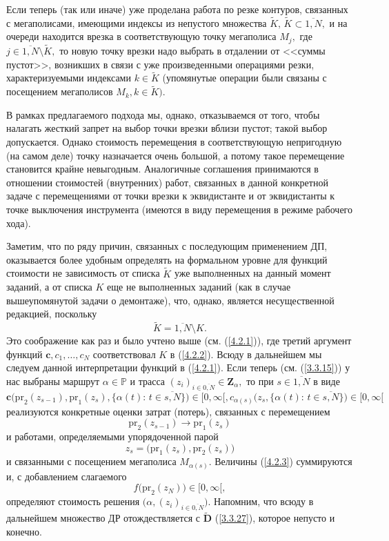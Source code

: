 \documentclass[11pt,twoside,openany]{report}
\newcommand{\bfn}{\begin{equation}}
\newcommand{\efn}{\end{equation}}
\newcommand{\ov}{\overline}
\newcommand{\al}{\alpha}
\newcommand{\su}{\subset}
\newcommand{\sm}{\setminus}
\newcommand{\bbp}{{\mathbb P}}
\begin{document}
{Если теперь (так или иначе) уже проделана работа по резке контуров,
связанных с мегаполисами, имеющими индексы из непустого множества
$\widetilde{K},\, \widetilde{K}\su \ov{1,N},$ и на очереди находится
врезка в соответствующую точку мегаполиса $M_j,$ где $j\in \ov{1,N}\sm
\widetilde{K},$ то новую точку врезки надо выбрать  в отдалении от
<<суммы пустот>>, возникших в связи с уже произведенными операциями
резки, характеризуемыми индексами $k\in \widetilde{K}$ (упомянутые
операции были связаны с посещением мегаполисов $M_k, k\in \widetilde{K}).$

В рамках предлагаемого подхода мы, однако, отказываемся от того, чтобы
налагать жесткий запрет на выбор точки врезки вблизи пустот; такой выбор
допускается. Однако стоимость перемещения в соответствующую непригодную
(на самом деле) точку назначается очень большой, а потому такое перемещение
становится крайне невыгодным.  Аналогичные соглашения принимаются в отношении
стоимостей (внутренних) работ, связанных в данной конкретной задаче  с
перемещениями от точки врезки к эквидистанте и от эквидистанты к точке
выключения инструмента (имеются в виду перемещения в режиме рабочего хода).

Заметим, что по ряду причин, связанных с последующим применением ДП,
оказывается более  удобным определять на формальном уровне для функций
стоимости не зависимость от списка $\widetilde{K}$ уже выполненных на
данный момент заданий, а от списка $K$ еще не выполненных заданий (как
в случае вышеупомянутой задачи о демонтаже), что, однако, является
несущественной редакцией, поскольку
\bfn\label{4.2.2}
\widetilde{K} = \ov{1,N}\sm K.
\efn
Это соображение как раз и было учтено выше (см. (\ref{4.2.1})), где третий
аргумент функций $\mathbf{c},c_1,\ldots,c_N$ соответствовал $K$ в (\ref{4.2.2}).
Всюду в дальнейшем мы следуем данной интерпретации функций в (\ref{4.2.1}).
Если теперь (см. (\ref{3.3.15}))
у нас выбраны маршрут $\al\in \bbp$ и трасса $(z_i)_{i\in\ov{0,N}}\in
\mathbf{Z}_\al,$ то при $s\in \ov{1,N}$
в виде
\bfn\label{4.2.3}
\mathbf{c}\bigl(\mathrm{pr}_2(z_{s-1}),\mathrm{pr}_1(z_s),\{\al(t):\,t\in \ov{s,N}\}\bigl)
\in [0,\infty[, c_{\al(s)}\bigl(z_s, \{\al(t):\,t\in \ov{s,N}\}\bigl)\in [0,\infty[
\efn
реализуются конкретные  оценки затрат (потерь), связанных с перемещением
$$ \mathrm{pr}_2(z_{s-1}) \longrightarrow \mathrm{pr}_1(z_s)
$$
и работами, определяемыми упорядоченной парой
$$z_s = \bigl(\mathrm{pr}_1(z_s),\mathrm{pr}_2(z_s)\bigl)$$
и связанными с посещением мегаполиса $M_{\al(s)}.$ Величины (\ref{4.2.3})
суммируются  и, с добавлением
слагаемого
$$
f\bigl(\mathrm{pr}_2(z_N)\bigl)\in [0,\infty[,
$$
определяют стоимость решения $\bigl(\al,(z_i)_{i\in\ov{0,N}}\bigl).$
Напомним, что всюду в дальнейшем множество ДР отождествляется с
$\widetilde{\mathbf{D}}$ (\ref{3.3.27}), которое непусто и конечно.

}
\end{document}
